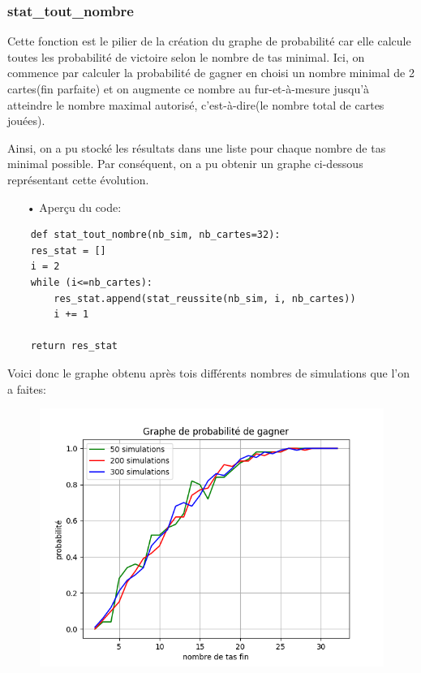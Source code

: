 \subsubsection{stat\_tout\_nombre}
Cette fonction est le pilier de la création du graphe de probabilité car elle calcule toutes les probabilité de victoire selon le nombre de tas minimal. Ici, on commence par calculer la probabilité de gagner en choisi un nombre minimal de 2 cartes(fin parfaite) et on augmente ce nombre au fur-et-à-mesure jusqu'à atteindre le nombre maximal autorisé, c'est-à-dire(le nombre total de cartes jouées).
\par Ainsi, on a pu stocké les résultats dans une liste pour chaque nombre de tas minimal possible. Par conséquent, on a pu obtenir un graphe ci-dessous représentant cette évolution.
	\\
	\begin{itemize}
	\color{blue}\item[•]Aperçu du code:
	\end{itemize}
	
	\lstset{language=Python}
	\lstset{frame=lines}
	\lstset{basicstyle=\footnotesize}
	\begin{lstlisting}
	def stat_tout_nombre(nb_sim, nb_cartes=32):
    res_stat = []
    i = 2
    while (i<=nb_cartes):
        res_stat.append(stat_reussite(nb_sim, i, nb_cartes))
        i += 1

    return res_stat
	\end{lstlisting}
	
\par Voici donc le graphe obtenu après tois différents nombres de simulations que l'on a faites:
\begin{figure}[h]
\centerline{\includegraphics{graphe.png}}
\end{figure}

